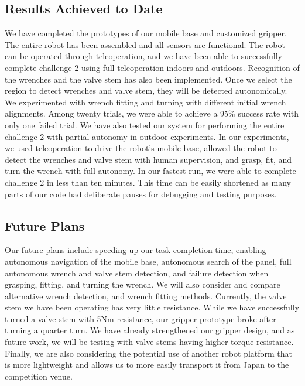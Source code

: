 \documentclass{standalone}
\begin{document}
\subsection{Results Achieved to Date}
We have completed the prototypes of our mobile base and customized gripper. The entire robot has been assembled and all sensors are functional. The robot can be operated through teleoperation, and we have been able to successfully complete challenge 2 using full teleoperation indoors and outdoors. 
Recognition of the wrenches and the valve stem has also been implemented. Once we select the region to detect wrenches and valve stem, they will be detected autonomically.
We experimented with wrench fitting and turning with different initial wrench alignments. Among twenty trials, we were able to achieve a 95$\%$ success rate with only one failed trial. 
We have also tested our system for performing the entire challenge 2 with partial autonomy in outdoor experiments. In our experiments, we used teleoperation to drive the robot’s mobile base, allowed the robot to detect the wrenches and valve stem with human supervision, and grasp, fit, and turn the wrench with full autonomy. In our fastest run, we were able to complete challenge 2 in less than ten minutes. This time can be easily shortened as many parts of our code had deliberate pauses for debugging and testing purposes.

\subsection{Future Plans}
Our future plans include speeding up our task completion time, enabling autonomous navigation of the mobile base, autonomous search of the panel, full autonomous wrench and valve stem detection, and failure detection when grasping, fitting, and turning the wrench. We will also consider and compare alternative wrench detection, and wrench fitting methods. Currently, the valve stem we have been operating has very little resistance. While we have successfully turned a valve stem with 5Nm resistance, our gripper prototype broke after turning a quarter turn. We have already strengthened our gripper design, and as future work, we will be testing with valve stems having higher torque resistance.  Finally, we are also considering the potential use of another robot platform that is more lightweight and allows us to more easily transport it from Japan to the competition venue. 
\end{document}
